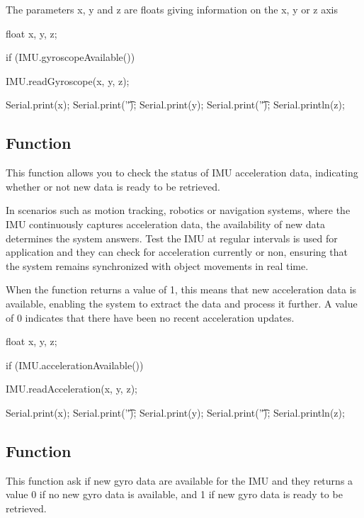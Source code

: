 The parameters x, y and z are floats giving information on the x, y or z axis 

\begin{Arduino}
	float x, y, z;
	
	if (IMU.gyroscopeAvailable()) {
		IMU.readGyroscope(x, y, z);
		
		Serial.print(x);
		Serial.print('\t');
		Serial.print(y);
		Serial.print('\t');
		Serial.println(z);	}
\end{Arduino}



\subsection{Function }

This function allows you to check the status of IMU acceleration data, indicating whether or not new data is ready to be retrieved.

In scenarios such as motion tracking, robotics or navigation systems, where the IMU continuously captures acceleration data, the availability of new data determines the system answers. Test the IMU at regular intervals is used for application and they can check for acceleration currently or non, ensuring that the system remains synchronized with object movements in real time. \cite{adafruit_lsm9ds1:2024}

When the function returns a value of 1, this means that new acceleration data is available, enabling the system to extract the data and process it further. A value of 0 indicates that there have been no recent acceleration updates.

\begin{Arduino}
	float x, y, z;
	
	if (IMU.accelerationAvailable()) {
		IMU.readAcceleration(x, y, z);
		
		Serial.print(x);
		Serial.print('\t');
		Serial.print(y);
		Serial.print('\t');
		Serial.println(z); }
	
\end{Arduino}


\subsection{Function }

This function ask if new gyro data are available for the IMU and they returns a value 0 if no new gyro data is available, and 1 if new gyro data is ready to be retrieved.

